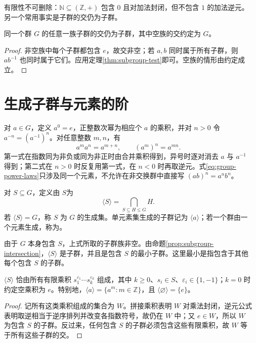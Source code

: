 \documentclass[UTF8,12pt,a4paper,fontset=fandol]{ctexbook}
\begin{document}
有限性不可删除：$\mathbb N\subseteq(\mathbb Z,+)$ 包含 $0$ 且对加法封闭，但不包含 $1$ 的加法逆元。另一个常用事实是子群的交仍为子群。

\begin{proposition}[子群的交]\label{prop:subgroup-intersection}
同一个群 $G$ 的任意一族子群的交仍为子群，其中空族的交约定为 $G$。
\end{proposition}
\begin{proof}
非空族中每个子群都包含 $e$，故交非空；若 $a,b$ 同时属于所有子群，则 $ab^{-1}$ 也同时属于它们。应用定理\ref{thm:subgroup-test}即可。空族的情形由约定成立。
\end{proof}

\section{生成子群与元素的阶}\label{sec:generated-subgroups}

对 $a\in G$，定义 $a^0=e$，正整数次幂为相应个 $a$ 的乘积，并对 $n>0$ 令 $a^{-n}=(a^{-1})^n$。对任意整数 $m,n$，有
\begin{equation}\label{eq:group-power-laws}
  a^ma^n=a^{m+n},\qquad (a^m)^n=a^{mn}.
\end{equation}
第一式在指数同为非负或同为非正时由合并乘积得到，异号时逐对消去 $a$ 与 $a^{-1}$ 得到；第二式在 $n>0$ 时反复用第一式，在 $n<0$ 时再取逆元。式\eqref{eq:group-power-laws}只涉及同一个元素，不允许在非交换群中直接写 $(ab)^n=a^nb^n$。

\begin{definition}[生成子群]
对 $S\subseteq G$，定义由 $S$为
\[
  \langle S\rangle=\bigcap_{S\subseteq H\leq G}H.
\]
若 $\langle S\rangle=G$，称 $S$ 为 $G$ 的生成集。单元素集生成的子群记为 $\langle a\rangle$；若一个群由一个元素生成，称为。
\end{definition}

由于 $G$ 本身包含 $S$，上式所取的子群族非空。由命题\ref{prop:subgroup-intersection}，$\langle S\rangle$ 是子群，并且是包含 $S$ 的最小子群。这里最小是指包含于其他每个包含 $S$ 的子群。

\begin{proposition}[生成子群的元素描述]\label{prop:generated-words}
$\langle S\rangle$ 恰由所有有限乘积 $s_1^{\varepsilon_1}\cdots s_k^{\varepsilon_k}$ 组成，其中 $k\geq0$、$s_i\in S$、$\varepsilon_i\in\{1,-1\}$；$k=0$ 时约定空乘积为 $e$。特别地，$\langle a\rangle=\{a^m:m\in\mathbb Z\}$，且 $\langle\varnothing\rangle=\{e\}$。
\end{proposition}
\begin{proof}
记所有这类乘积组成的集合为 $W$。拼接乘积表明 $W$ 对乘法封闭，逆元公式表明取逆相当于逆序排列并改变各指数符号，故仍在 $W$ 中；又 $e\in W$，所以 $W$ 为包含 $S$ 的子群。反过来，任何包含 $S$ 的子群必须包含这些有限乘积，故 $W$ 等于所有这些子群的交。
\end{proof}
\end{document}
